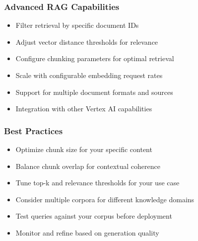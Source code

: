 \begin{frame}[fragile]\frametitle{Advanced RAG Capabilities}
      \begin{itemize}
        \item Filter retrieval by specific document IDs
        \item Adjust vector distance thresholds for relevance
        \item Configure chunking parameters for optimal retrieval
        \item Scale with configurable embedding request rates
        \item Support for multiple document formats and sources
        \item Integration with other Vertex AI capabilities
      \end{itemize}
\end{frame}

\begin{frame}[fragile]\frametitle{Best Practices}
      \begin{itemize}
        \item Optimize chunk size for your specific content
        \item Balance chunk overlap for contextual coherence
        \item Tune top-k and relevance thresholds for your use case
        \item Consider multiple corpora for different knowledge domains
        \item Test queries against your corpus before deployment
        \item Monitor and refine based on generation quality
      \end{itemize}
\end{frame}